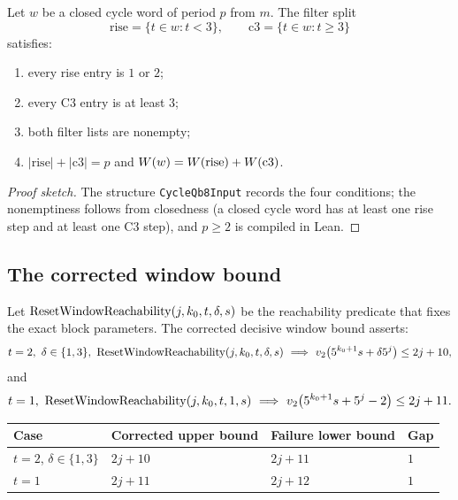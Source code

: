 \begin{proposition}[QB-8 split]\label{prop:qb8}
Let $w$ be a closed cycle word of period $p$ from $m$.  The filter
split
\begin{equation*}
  \mathrm{rise}=\{t\in w:t<3\},\qquad
  \mathrm{c3}=\{t\in w:t\ge3\}
\end{equation*}
satisfies:
\begin{enumerate}[leftmargin=*]
\item every rise entry is $1$ or $2$;
\item every C3 entry is at least $3$;
\item both filter lists are nonempty;
\item $|\mathrm{rise}|+|\mathrm{c3}|=p$ and
  $W(w)=W(\mathrm{rise})+W(\mathrm{c3})$.
\end{enumerate}
\end{proposition}

\begin{proof}[Proof sketch]
The structure \texttt{CycleQb8Input} records the four conditions; the
nonemptiness follows from closedness (a closed cycle word has at least
one rise step and at least one C3 step), and $p\ge2$ is compiled in
Lean.
\end{proof}

\subsection{The corrected window bound}

\begin{definition}\label{def:corrected}
Let $\mathrm{ResetWindowReachability}(j,k_0,t,\delta,s)$ be the reachability predicate that
fixes the exact block parameters.  The corrected decisive window bound
asserts:
\begin{equation*}
  t=2,\ \delta\in\{1,3\},\ \ResetWindow(j,k_0,t,\delta,s)
    \ \Longrightarrow\ \vtwo{5^{k_0+1}s+\delta5^j}\le 2j+10,
\end{equation*}
and
\begin{equation*}
  t=1,\ \mathrm{ResetWindowReachability}(j,k_0,t,1,s)
    \ \Longrightarrow\ v_2\!\left(5^{k_0+1}s+5^j-2\right)\le 2j+11.
\end{equation*}
\end{definition}

\begin{center}
\small
\begin{tabular}{@{}llll@{}}
\toprule
Case & Corrected upper bound & Failure lower bound & Gap \\
\midrule
$t=2$, $\delta\in\{1,3\}$ & $2j+10$ & $2j+11$ & $1$ \\
$t=1$ & $2j+11$ & $2j+12$ & $1$ \\
\bottomrule
\end{tabular}
\end{center}

